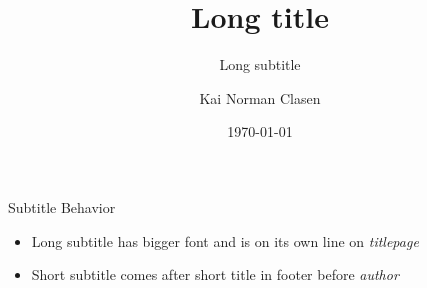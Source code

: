 \documentclass[aspectratio=169]{beamer}
\title[Short title]{Long title}
\subtitle[Short subtitle]{Long subtitle}
\author{Kai Norman Clasen}
\institute{}
\date{\today}
\begin{document}
  \maketitle

  \begin{frame}{Subtitle Behavior}
    \begin{itemize}
      \item Long subtitle has bigger font and is on its own line on \emph{titlepage}
      \item Short subtitle comes after short title in footer before \emph{author}
    \end{itemize}
  \end{frame}
\end{document}
